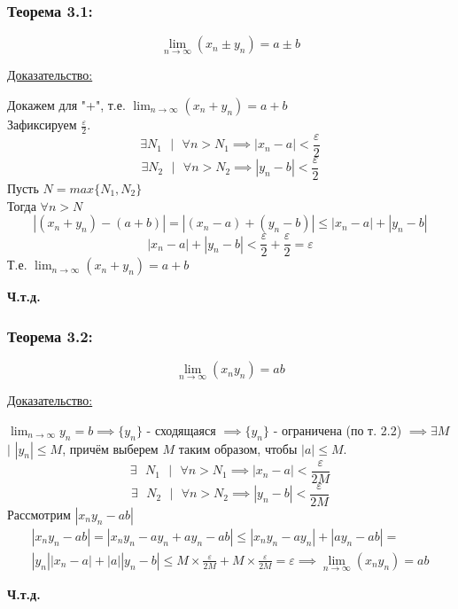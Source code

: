 \documentclass[12pt]{article}
\def\posl#1#2{\{#1_{#2}\}}
\begin{document}
    \subsubsection*{Теорема 3.1:}
    \[\lim_{n\to\infty}(x_n \pm y_n) = a \pm b\]\par\noindent
    \underline{Доказательство:}\par
    \begin{adjustwidth}{1.5em}{1.5em}
        Докажем для "+", т.е. $\lim_{n\to\infty} (x_n + y_n) = a + b$\\
        Зафиксируем $\frac{\varepsilon}{2}$.\\
        \[\exists N_{1} \text{ } \big| \text{ } \forall n > N_{1} \implies |x_n - a| < \frac{\varepsilon}{2}\]
        \[\exists N_{2} \text{ } \big| \text{ } \forall n > N_{2} \implies |y_n - b| < \frac{\varepsilon}{2}\]
        Пусть $N = max\{N_{1},N_{2}\}$\\
        Тогда $\forall n > N$ 
        \[|(x_n + y_n) - (a+b)| = |(x_n - a) + (y_n - b)| \le |x_n - a| + |y_n - b|\]
        \[|x_n - a| + |y_n - b| < \frac{\varepsilon}{2} + \frac{\varepsilon}{2} = \varepsilon\]
        Т.е. $\lim_{n\to\infty} (x_n + y_n) = a + b$
        \begin{center}
            \textbf{Ч.т.д.}
        \end{center}
    \end{adjustwidth}
    
    \subsubsection*{Теорема 3.2:}
    \[\lim_{n\to\infty}(x_ny_n) = ab\]\par\noindent
    \underline{Доказательство:}\par
    \begin{adjustwidth}{1.5em}{1.5em}
        $\lim_{n\to\infty}y_n = b \implies \posl{y}{n}$ - сходящаяся $\implies \posl{y}{n}$ - ограничена (по т. 2.2) $\implies \exists M$ $\big|$ $|y_n| \le M$, причём выберем $M$ таким образом, чтобы $|a| \le M$.\\
        \[ \exists \text{ } N_{1} \text{ } \big| \text{ } \forall n > N_{1} \implies |x_n - a| < \frac{\varepsilon}{2M} \]
        \[ \exists \text{ } N_{2} \text{ } \big| \text{ } \forall n > N_{2} \implies |y_n - b| < \frac{\varepsilon}{2M} \]
        Рассмотрим $|x_ny_n-ab|$
        \begin{gather*}
            |x_ny_n-ab| = |x_ny_n - ay_n + ay_n - ab| \le |x_ny_n - ay_n| + |ay_n - ab| =\\
            |y_n||x_n-a| + |a||y_n - b| \le M \times \frac{\varepsilon}{2M} + M \times \frac{\varepsilon}{2M} = \varepsilon \implies \lim_{n\to\infty} (x_ny_n) = ab
        \end{gather*}
        \begin{center}
            \textbf{Ч.т.д.}
        \end{center}
    \end{adjustwidth}
\end{document}
